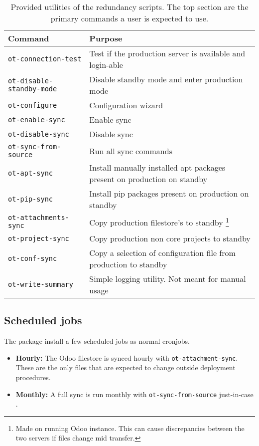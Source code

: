 \documentclass[a4paper]{article}
\begin{document}
\begin{table}[h!]
\centering
\begin{tabular}{l | l }
	\textbf{Command}	& \textbf{Purpose} \\ \hline
	\texttt{ot-connection-test}	& Test if the production server is available and login-able \\
	\texttt{ot-disable-standby-mode}	& Disable standby mode and enter production mode \\
	\texttt{ot-configure}			& Configuration wizard \\
	\texttt{ot-enable-sync}			& Enable sync \\
	\texttt{ot-disable-sync}		& Disable sync \\
	\texttt{ot-sync-from-source}	& Run all sync commands \\ \hline
	\texttt{ot-apt-sync}			& Install manually installed apt packages present on production on standby \\
	\texttt{ot-pip-sync}			& Install pip packages present on production on standby  \\
	\texttt{ot-attachments-sync	}	& Copy production filestore's to standby \footnote{Made on running Odoo instance. This can cause discrepancies between the two servers if files change mid transfer.} \\
	\texttt{ot-project-sync}		& Copy production non core projects to standby  \\
	\texttt{ot-conf-sync}			& Copy a selection of configuration file from production to standby  \\
	\texttt{ot-write-summary}		& Simple logging utility. Not meant for manual usage  \\ \hline
\end{tabular}
\caption{Provided utilities of the redundancy scripts. The top section are the primary commands a user is expected to use.}
\label{tab:commands}
\end{table}
\subsection{Scheduled jobs}

The package install a few scheduled jobs as normal cronjobs.

\begin{itemize}
	\item \textbf{Hourly:} The Odoo filestore is synced hourly with \texttt{ot-attachment-sync}. These are the only files that are expected to change outside deployment procedures.
	\item \textbf{Monthly:} A full sync is run monthly with \texttt{ot-sync-from-source} just-in-case . 
\end{itemize}
\end{document}
